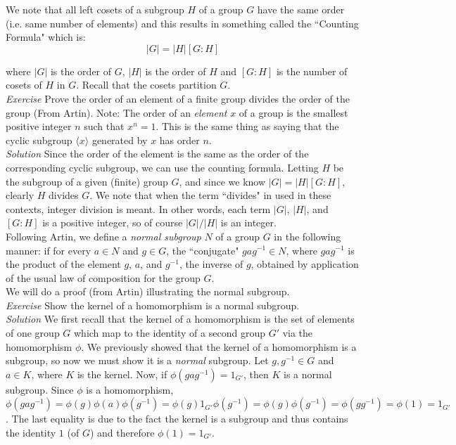 We note that all left cosets of a subgroup $H$ of a group $G$ have the same order (i.e. same number of elements) and this results in something called the ``Counting Formula" which is:\\

\begin{displaymath}
|G| = |H| [G:H]
\end{displaymath}

where $|G|$ is the order of $G$, $|H|$ is the order of $H$ and $[G:H]$ is the number of cosets of $H$ in $G$.  Recall that the cosets partition $G$.\\

\textit{Exercise} Prove the order of an element of a finite group divides the order of the group (From Artin).  Note:  The order of an \textit{element} $x$ of a group is the smallest positive integer $n$ such that $x^{n}=1$.  This is the same thing as saying that the cyclic subgroup $\langle x \rangle$ generated by $x$ has order $n$.\\

\textit{Solution}  Since the order of the element is the same as the order of the corresponding cyclic subgroup, we can use the counting formula.  Letting $H$ be the subgroup of a given (finite) group $G$, and since we know $|G| = |H| [G:H]$, clearly $H$ divides $G$.  We note that when the term ``divides" in used in these contexts, integer division is meant.  In other words, each term $|G|$, $|H|$, and $[G:H]$ is a positive integer, so of course $|G| / |H|$ is an integer.\\

Following Artin, we define a \textit{normal subgroup} $N$ of a group $G$ in the following manner:  if for every $a \in N$ and $g \in G$, the ``conjugate" $gag^{-1} \in N$, where $gag^{-1}$ is the product of the element $g$, $a$, and $g^{-1}$, the inverse of $g$, obtained by application of the usual law of composition for the group $G$.\\

We will do a proof (from Artin) illustrating the normal subgroup.\\

\textit{Exercise} Show the kernel of a homomorphism is a normal subgroup.\\

\textit{Solution} We first recall that the kernel of a homomorphism is the set of elements of one group $G$ which map to the identity of a second group $G'$ via the homomorphism $\phi$.  We previously showed that the kernel of a homomorphism is a subgroup, so now we must show it is a \textit{normal} subgroup.  Let $g,g^{-1} \in G$ and $a \in K$, where $K$ is the kernel.  Now, if $\phi(gag^{-1})=1_{G'}$, then $K$ is a normal subgroup.  Since $\phi$ is a homomorphism, $\phi(gag^{-1})=\phi(g)\phi(a)\phi(g^{-1})=\phi(g)1_{G'}\phi(g^{-1})=\phi(g)\phi(g^{-1})=\phi(gg^{-1})=\phi(1)=1_{G'}$.  The last equality is due to the fact the kernel is a subgroup and thus contains the identity $1$ (of $G$) and therefore $\phi(1)=1_{G'}$. 

